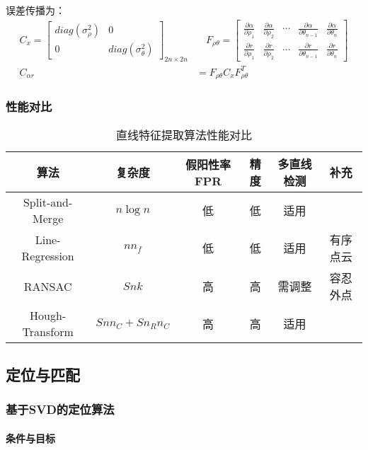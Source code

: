 \documentclass[
12pt, %
a4paper, 
oneside, %
headinclude,footinclude, %
]{scrartcl}
\begin{document}
误差传播为：
\begin{align*}
C_x = \begin{bmatrix} diag(\sigma_\rho^2) & 0 \\ 0 & diag(\sigma_\theta^2) \end{bmatrix}_{2n \times 2n} &\quad
F_{\rho\theta} = \begin{bmatrix} \frac{\partial \alpha}{\partial \rho_1} & \frac{\partial \alpha}{\partial \rho_2} & \cdots & \frac{\partial \alpha}{\partial \theta_{n - 1}} & \frac{\partial \alpha}{\partial \theta_n} \\ \frac{\partial r}{\partial \rho_1} & \frac{\partial r}{\partial \rho_2} & \cdots & \frac{\partial r}{\partial \theta_{n - 1}} & \frac{\partial r}{\partial \theta_n} \end{bmatrix} \\
C_{\alpha r} &= F_{\rho\theta} C_x F_{\rho\theta}^T    
\end{align*}
\subsubsection[性能对比]{性能对比}
\begin{table}[H]
\centering
\begin{tabular}{c|ccccc}
\hline
算法 & 复杂度 & 假阳性率FPR & 精度 & 多直线检测 & 补充 \\
\hline
Split-and-Merge & $ n \log n $ & 低 & 低 & 适用 &  \\
Line-Regression & $ n n_f $ & 低 & 低 & 适用 & 有序点云 \\
RANSAC & $ S n k $ & 高 & 高 & 需调整 & 容忍外点 \\
Hough-Transform & $ S n n_C + S n_R n_C $ & 高 & 高 & 适用 &  \\
\hline
\end{tabular}
\caption{直线特征提取算法性能对比}
\end{table}
\subsection[定位与匹配]{定位与匹配}
\subsubsection[基于SVD的定位算法]{基于SVD的定位算法}
\paragraph{条件与目标}~\\
\end{document}
